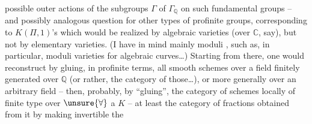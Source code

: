 possible outer actions of the subgroups $\Gamma$ of $\Gamma_{\mathbb{Q}}$ on such fundamental groups -- and possibly analogous question for other types of profinite groups, corresponding to $K(\Pi,1)$'s which would be realized by algebraic varieties (over $\mathbb{C}$, say), but not by elementary varieties. (I have in mind mainly moduli  , such as, in particular, moduli varieties for algebraic curves\ldots) Starting from there, one would reconstruct by gluing, in profinite terms, all smooth schemes over a field finitely generated over $\mathbb{Q}$ (or rather, the category of those\ldots), or more generally over an arbitrary field -- then, probably, by ``gluing'', the category of schemes locally of finite type over $\unsure{\forall}$ a $K$ -- at least the category of fractions obtained from it by  making invertible the
